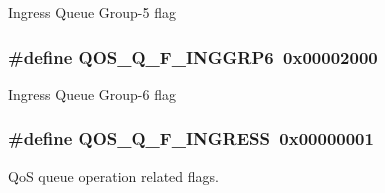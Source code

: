 Ingress Queue Group-\/5 flag \hypertarget{group__FAPI__QOS__QUEUE_ga5046759dc7d0ebae110694a9be334def}{
\subsubsection[{Q\-O\-S\-\_\-\-Q\-\_\-\-F\-\_\-\-I\-N\-G\-G\-R\-P6}]{\setlength{\rightskip}{0pt plus 5cm}\#define Q\-O\-S\-\_\-\-Q\-\_\-\-F\-\_\-\-I\-N\-G\-G\-R\-P6~0x00002000}}\label{group__FAPI__QOS__QUEUE_ga5046759dc7d0ebae110694a9be334def}
Ingress Queue Group-\/6 flag \hypertarget{group__FAPI__QOS__QUEUE_ga7306e528452e4389e8c7a76dbbf3af64}{
\subsubsection[{Q\-O\-S\-\_\-\-Q\-\_\-\-F\-\_\-\-I\-N\-G\-R\-E\-S\-S}]{\setlength{\rightskip}{0pt plus 5cm}\#define Q\-O\-S\-\_\-\-Q\-\_\-\-F\-\_\-\-I\-N\-G\-R\-E\-S\-S~0x00000001}}\label{group__FAPI__QOS__QUEUE_ga7306e528452e4389e8c7a76dbbf3af64}


Qo\-S queue operation related flags. 

